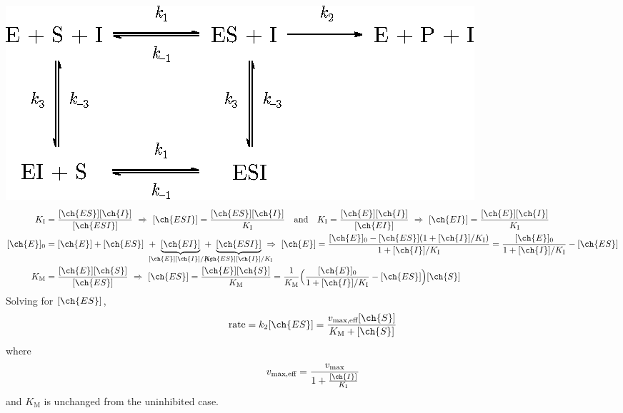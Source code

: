 \documentclass[11pt,a4paper,twoside]{article}
\numberwithin{equation}{section}
\begin{document}
\hspace*{2em}\includegraphics{noncompetitive_inhibition.eps}\\

\begin{align}
    K_{\text{I}} & = \frac{[\ch{ES}][\ch{I}]}{[\ch{ESI}]} \ \Rightarrow \
    [\ch{ESI}] = \frac{[\ch{ES}][\ch{I}]}{K_{\text{I}}} \qqtext{and}
    K_{\text{I}} = \frac{[\ch{E}][\ch{I}]}{[\ch{EI}]} \ \Rightarrow \
    [\ch{EI}] = \frac{[\ch{E}][\ch{I}]}{K_{\text{I}}} \\
    [\ch{E}]_0 & =  [\ch{E}] + [\ch{ES}] 
        \ + \ \underbrace{[\ch{EI}]}_{\mathclap{[\ch{E}][\ch{I}] / K_{\text{I}}}}
        \ + \ \underbrace{[\ch{ESI}]}_{\mathclap{[\ch{ES}][\ch{I}] / K_{\text{I}}}}
        \ \Rightarrow \
        [\ch{E}] = \frac{[\ch{E}]_0 - [\ch{ES}]\qty(1 + [\ch{I}] / K_{\text{I}})}{1 + [\ch{I}] / K_{\text{I}}} = \frac{[\ch{E}]_0}{1 + [\ch{I}] / K_{\text{I}}} - [\ch{ES}] \\
    K_{\text{M}} & = \frac{[\ch{E}][\ch{S}]}{[\ch{ES}]} \ \Rightarrow \
        [\ch{ES}] = \frac{[\ch{E}][\ch{S}]}{K_{\text{M}}} = \frac{1}{K_{\text{M}}} 
        \qty\Big( \frac{[\ch{E}]_0}{1 + [\ch{I}] / K_{\text{I}}} - [\ch{ES}]  ) [\ch{S}]   
\end{align}
Solving for $[\ch{ES}]$,
\begin{equation}
    \text{rate} = k_2 [\ch{ES}] = \frac{v_{\text{max,eff}} [\ch{S}]}{K_{\text{M}} + [\ch{S}]}
\end{equation}
where
\begin{equation}
    v_{\text{max,eff}} = \frac{
        v_{\text{max}}
    }{
        1 + \frac{[\ch{I}]}{K_{\text{I}}}
    }
\end{equation}
and $K_{\text{M}}$ is unchanged from the uninhibited case.
\end{document}
